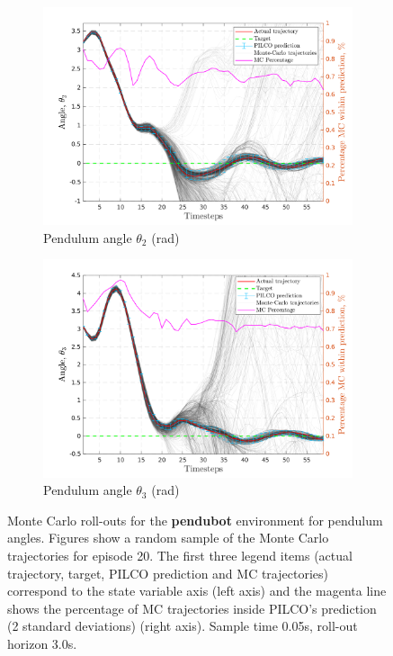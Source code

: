 \begin{figure}[htbp]    
   \begin{subfigure}[b]{1\linewidth}
    \centering
    \includegraphics[height=0.4\textheight,width=1\textwidth]{Chapter3/Figures/pen_MC_rollout_Ep_40_Dim_3.png} 
    \caption{Pendulum angle $\theta_2$ (rad)} 
    \label{Fig:Re-pen-pen-velocity} 
  \end{subfigure} 
  \hspace{\fill}
  \begin{subfigure}[b]{1\linewidth}
    \centering
    \includegraphics[height=0.4\textheight,width=1\textwidth]{Chapter3/Figures/pen_MC_rollout_Ep_40_Dim_4.png} 
    \caption{Pendulum angle $\theta_3$ (rad)} 
    \label{Fig:Re-pen-pen-angle} 
  \end{subfigure} 

\caption[Monte Carlo roll-outs for \textbf{pendubot} pendulum angles]{Monte Carlo roll-outs for the \textbf{pendubot} environment for pendulum angles. Figures show a random sample of the Monte Carlo trajectories for episode 20. The first three legend items (actual trajectory, target, PILCO prediction and MC trajectories) correspond to the state variable axis (left axis) and the magenta line shows the percentage of MC trajectories inside PILCO's prediction (2 standard deviations) (right axis). Sample time 0.05s, roll-out horizon 3.0s.}
\label{Fig:Re-pen-MC-roll-outs-2} 
\end{figure}
 
